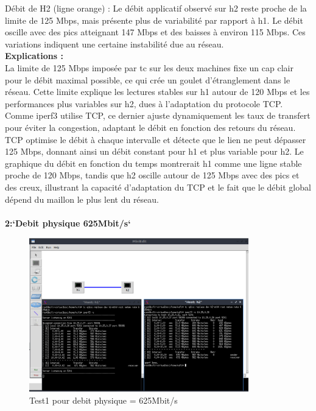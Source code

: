Débit de H2 (ligne orange) : Le débit applicatif observé sur h2 reste proche de la limite de 125 Mbps, mais présente plus de variabilité par rapport à h1. Le débit oscille avec des pics atteignant 147 Mbps et des baisses à environ 115 Mbps. Ces variations indiquent une certaine instabilité due au réseau.
\vspace{1cm}
\\
\textbf{Explications :} 
\\
La limite de 125 Mbps imposée par tc sur les deux machines fixe un cap clair pour le débit maximal possible, ce qui crée un goulet d’étranglement dans le réseau. Cette limite explique les lectures stables sur h1 autour de 120 Mbps et les performances plus variables sur h2, dues à l’adaptation du protocole TCP. Comme iperf3 utilise TCP, ce dernier ajuste dynamiquement les taux de transfert pour éviter la congestion, adaptant le débit en fonction des retours du réseau. TCP optimise le débit à chaque intervalle et détecte que le lien ne peut dépasser 125 Mbps, donnant ainsi un débit constant pour h1 et plus variable pour h2. Le graphique du débit en fonction du temps montrerait h1 comme une ligne stable proche de 120 Mbps, tandis que h2 oscille autour de 125 Mbps avec des pics et des creux, illustrant la capacité d’adaptation du TCP et le fait que le débit global dépend du maillon le plus lent du réseau.\\
\\
\textbf{2:`Debit physique 625Mbit/s`} 
\begin{figure}[H]
    \centering
    \includegraphics[width=0.85\textwidth]{./images/T1.1/625test1.png}
    \caption{Test1 pour debit physique = 625Mbit/s}
    \label{fig:exemple}
\end{figure}
